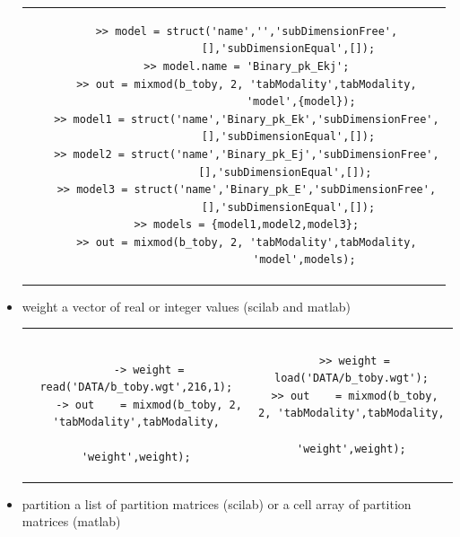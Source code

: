 \begin{itemize}
\begin{tabular}{c|c}
\begin{minipage}[c]{0.5\columnwidth}
{\begin{verbatim}
\end{verbatim}}
\end{minipage}%
&
\begin{minipage}[c]{0.58\columnwidth}%
{\scriptsize
\begin{verbatim}
  >> model = struct('name','','subDimensionFree',
               [],'subDimensionEqual',[]);
  >> model.name = 'Binary_pk_Ekj';
  >> out = mixmod(b_toby, 2, 'tabModality',tabModality,
                   'model',{model});
  >> model1 = struct('name','Binary_pk_Ek','subDimensionFree',
               [],'subDimensionEqual',[]);
  >> model2 = struct('name','Binary_pk_Ej','subDimensionFree',
              [],'subDimensionEqual',[]);
  >> model3 = struct('name','Binary_pk_E','subDimensionFree',
               [],'subDimensionEqual',[]);
  >> models = {model1,model2,model3};
  >> out = mixmod(b_toby, 2, 'tabModality',tabModality,
                    'model',models);

\end{verbatim}}
\end{minipage}%
\end{tabular}



\item weight a vector of real or integer values (scilab and matlab)


\begin{tabular}{c|c}
\begin{minipage}[c]{0.52\columnwidth}%
{\scriptsize
\begin{verbatim}

    -> weight = read('DATA/b_toby.wgt',216,1);
    -> out    = mixmod(b_toby, 2, 'tabModality',tabModality,
                       'weight',weight);

\end{verbatim}}
\end{minipage}%
&
\begin{minipage}[c]{0.52\columnwidth}%
{\scriptsize
\begin{verbatim}
 >> weight = load('DATA/b_toby.wgt');
 >> out    = mixmod(b_toby, 2, 'tabModality',tabModality,
                       'weight',weight);

\end{verbatim}}
\end{minipage}%
\end{tabular}


\item partition a list of partition matrices (scilab) or a cell array of partition matrices (matlab)



\end{itemize}
